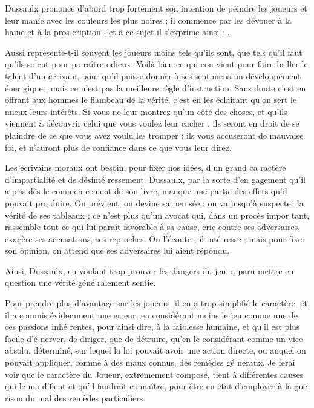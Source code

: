 Dussaulx prononce d'abord trop
fortement son intention de peindre
les joueurs et leur manie avec les
couleurs les plus noires ; il commence
par les dévouer à la haine et à la pros%
cription ; et à ce sujet il s'exprime
ainsi : .

Aussi représente-t-il souvent les
joueurs moins tels qu'ils sont, que
tels qu'il faut qu'ils soient pour pa%
raître odieux. Voilà bien ce qui con%
vient pour faire briller le talent d'un
écrivain, pour qu'il puisse donner à
ses sentimens un développement éner%
gique ; mais ce n'est pas la meilleure
règle d'instruction. Sans doute c'est
en offrant aux hommes le flambeau
de la vérité, c'est en les éclairant qu'on
sert le mieux leurs intérêts. Si vous ne
leur montrez qu'un côté des choses,
et qu'ils viennent à découvrir celui
que vous voulez leur cacher , ils
seront en droit de se plaindre de ce
que vous avez voulu les tromper ; ils
vous accuseront de mauvaise foi, et
n'auront plus de confiance dans ce
que vous leur direz.

Les écrivains moraux ont besoin,
pour fixer nos idées, d'un grand ca%
ractère d'impartialité et de désinté%
ressement. Dussaulx, par la sorte d'en%
gagement qu'il a pris dès le commen%
cement de son livre, manque une
partie des effets qu'il pouvait pro%
duire. On prévient, on devine sa pen%
sée ; on va jusqu'à suspecter la vérité
de ses tableaux ; ce n'est plus qu'un
avocat qui, dans un procès impor%
tant, rassemble tout ce qui lui paraît
favorable à sa cause, crie contre ses
adversaires, exagère ses accusations,
ses reproches. On l'écoute ; il inté%
resse ; mais pour fixer son opinion,
on attend que ses adversaires lui aient
répondu.

Ainsi, Dussaulx, en voulant trop
prouver les dangers du jeu, a paru
mettre en question une vérité géné%
ralement sentie.

Pour prendre plus d'avantage sur
les joueurs, il en a trop simplifié le
caractère, et il a commis évidemment
une erreur, en considérant moins le
jeu comme une de ces passions inhé%
rentes, pour ainsi dire, à la faiblesse
humaine, et qu'il est plus facile d'é%
nerver, de diriger, que de détruire,
qu'en le considérant comme un vice
absolu, déterminé, sur lequel la loi
pouvait avoir une action directe, ou
auquel on pouvait appliquer, comme
à des maux connus, des remèdes gé%
néraux. Je ferai voir que le caractère
du Joueur, extremement composé,
tient à différentes causes qui le mo%
difient et qu'il faudrait connaître,
pour être en état d'employer à la gué%
rison du mal des remèdes particuliers.

